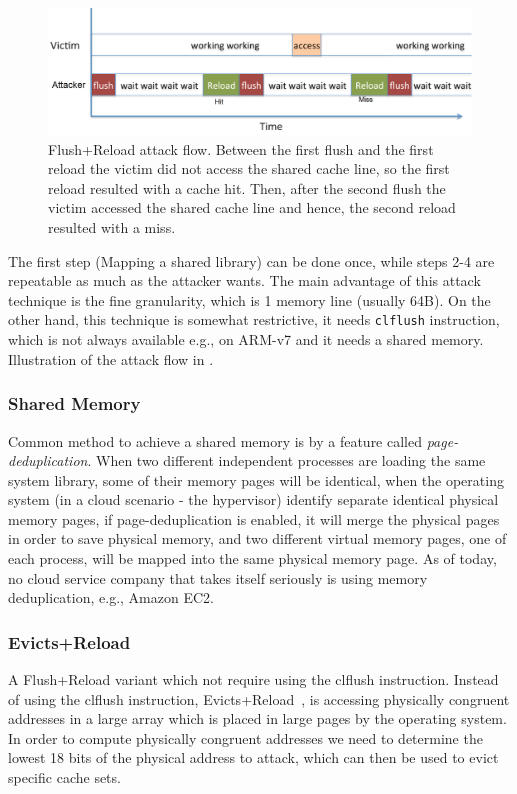 \begin{figure}[!ht]
    \centering
    \includegraphics[width=\textwidth]{images/chapter_6/fr_flow.png}
    \caption{Flush+Reload attack flow. Between the first flush and the first reload the victim did not access the shared cache line, so the first reload resulted with a cache hit. Then, after the second flush the victim accessed the shared cache line and hence, the second reload resulted with a miss.}
    \label{fig:fr_flow}
\end{figure}

\noindent The first step (Mapping a shared library) can be done once, while
steps 2-4 are repeatable as much as the attacker wants. The main advantage of
this attack technique is the fine granularity, which is 1 memory line (usually
64B). On the other hand, this technique is somewhat restrictive, it needs
\texttt{clflush} instruction, which is not always available e.g., on ARM-v7 and
it needs a shared memory. Illustration of the attack flow in .

\subsubsection{Shared Memory}
\label{subsubsec:sharedmemory}
Common method to achieve a shared memory is by a feature called
\textit{page-deduplication}. When two different independent processes are
loading the same system library, some of their memory pages will be identical,
when the operating system (in a cloud scenario - the hypervisor) identify
separate identical physical memory pages, if page-deduplication is enabled, it
will merge the physical pages in order to save physical memory, and two
different virtual memory pages, one of each process, will be mapped into the
same physical memory page. As of today, no cloud service company that takes
itself seriously is using memory deduplication, e.g., Amazon EC2.

\subsubsection{Evicts+Reload}
\label{subsubsec:evictreload}
A Flush+Reload variant which not require using the clflush instruction.
Instead of using the clflush instruction, Evicts+Reload~\cite{Gruss2015}, is accessing physically congruent addresses in
a large array which is placed in large pages by the operating system. In order to compute physically congruent addresses we need to determine the lowest 18 bits of the physical address to attack, which can then be used to evict specific cache sets.

